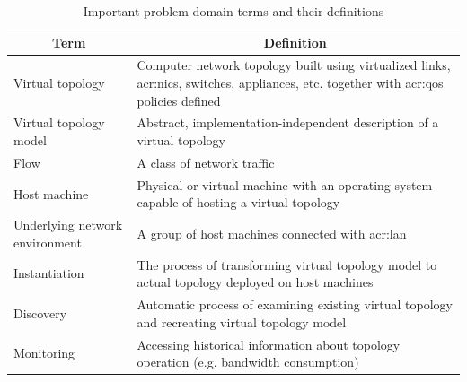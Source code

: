 \documentclass[11pt,openany]{book}
\begin{document}
      \begin{table}[H]
        \centering

        \begin{tabularx}{\textwidth}{|l|X|}
          \hline
          \multicolumn{1}{|c|}{Term}     & \multicolumn{1}{c|}{Definition}                                            \\
          \hline \hline
          Virtual topology               & Computer network topology built using virtualized links, \gls{acr:nic}s,
                                           switches, appliances, etc. together with \gls{acr:qos} policies defined    \\
          \hline
          Virtual topology model         & Abstract, implementation-independent description of a virtual topology     \\
          \hline
          Flow                           & A class of network traffic                                                 \\
          \hline
          Host machine                   & Physical or virtual machine with an operating system capable of hosting
                                           a virtual topology                                                         \\
          \hline
          Underlying network environment & A group of host machines connected with \gls{acr:lan}                      \\
          \hline
          Instantiation                  & The process of transforming virtual topology model to actual topology
                                           deployed on host machines                                                  \\
          \hline
          Discovery                      & Automatic process of examining existing virtual topology and recreating
                                           virtual topology model                                                     \\
          \hline
          Monitoring                     & Accessing historical information about topology operation (e.g. bandwidth
                                           consumption)                                                               \\
          \hline
        \end{tabularx}
        
        \caption{Important problem domain terms and their definitions}
        \label{tab:req:def}
      \end{table}
\end{document}
